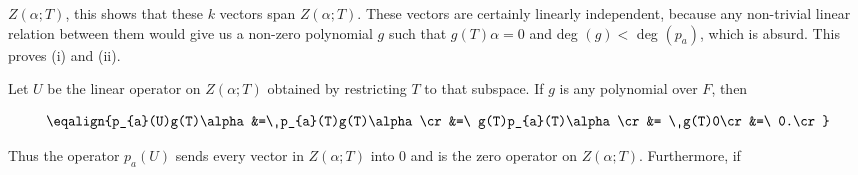 \(Z(\alpha;T)\), this shows that these \(k\) vectors span \(Z(\alpha;T)\). These vectors are certainly linearly independent, because any non-trivial linear relation between them would give us a non-zero polynomial \(g\) such that \(g(T)\alpha=0\) and deg \((g)<\) deg \((p_{a})\), which is absurd. This proves (i) and (ii).

Let \(U\) be the linear operator on \(Z(\alpha;T)\) obtained by restricting \(T\) to that subspace. If \(g\) is any polynomial over \(F\), then

\[\eqalign{p_{a}(U)g(T)\alpha&=\ p_{a}(T)g(T)\alpha\cr&=\ g(T)p_{a}(T)\alpha\cr&= \ g(T)0\cr&=\ 0.\cr}\]

Thus the operator \(p_{a}(U)\) sends every vector in \(Z(\alpha;T)\) into \(0\) and is the zero operator on \(Z(\alpha;T)\). Furthermore, if \ 